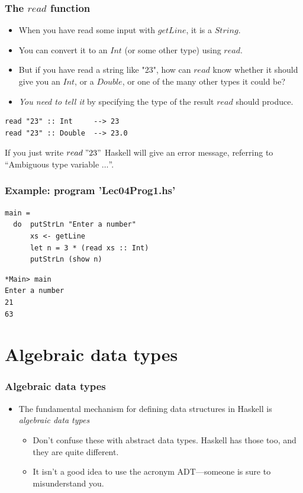 \documentclass{beamer}
\begin{document}
\begin{frame}[fragile]
\frametitle{The $read$ function}

\begin{itemize}
\item When you have read some input with $getLine$, it is a
  $String$.
\item You can convert it to an $Int$ (or some other type) using
  $read$.
\item But if you have read a string like "23", how can $read$ know
  whether it should give you an $Int$, or a $Double$, or one of the
  many other types it could be?
\item \emph{You need to tell it} by specifying the type of the
  result $read$ should produce.
\end{itemize}

\begin{verbatim}
read "23" :: Int     --> 23
read "23" :: Double  --> 23.0
\end{verbatim}

If you just write $read\; "23"$ Haskell will give an error message,
referring to ``Ambiguous type variable $\ldots$''.

\end{frame}

\begin{frame}[fragile]
\frametitle{Example: program 'Lec04Prog1.hs'}

\begin{verbatim}
main =
  do  putStrLn "Enter a number"
      xs <- getLine
      let n = 3 * (read xs :: Int)
      putStrLn (show n)
\end{verbatim}

\begin{verbatim}
*Main> main
Enter a number
21
63
\end{verbatim}

\end{frame}

\section{Algebraic data types}
\begin{frame}
\frametitle{Algebraic data types}

\begin{itemize}
\item The fundamental mechanism for defining data structures in
  Haskell is \emph{algebraic data types}
  \begin{itemize}
  \item Don't confuse these with abstract data types.  Haskell has
    those too, and they are quite different.
  \item It isn't a good idea to use the acronym ADT---someone is
    sure to misunderstand you.
  \end{itemize}
\end{itemize}

\end{frame}
\end{document}
